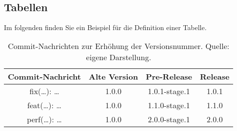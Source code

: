 \subsection{Tabellen}

Im folgenden finden Sie ein Beispiel für die Definition einer Tabelle.

\begin{table}[h!]
  \centering
  \setlength{\extrarowheight}{5pt}
  \begin{tabular}{|c|c|c|c|}
    \hline
    \textbf{Commit-Nachricht} & \textbf{Alte Version} & \textbf{Pre-Release} & \textbf{Release} \\
    \hline
    fix(\ldots): \ldots & 1.0.0 & 1.0.1-stage.1 & 1.0.1\\
    \hline
    feat(\ldots): \ldots & 1.0.0 & 1.1.0-stage.1 & 1.1.0\\
    \hline
    perf(\ldots): \ldots & 1.0.0 & 2.0.0-stage.1 & 2.0.0\\
    \hline
  \end{tabular}
  \caption[Commit-Nachrichten zur Erhöhung der Versionsnummer.]{Commit-Nachrichten zur Erhöhung der Versionsnummer. Quelle: eigene Darstellung.}
  \label{tab:semantic-release}
\end{table}
